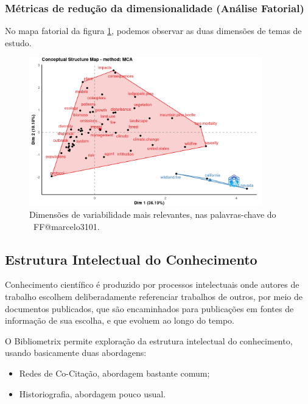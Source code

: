 \subsubsection{Métricas de redução da dimensionalidade (Análise Fatorial)}

No mapa fatorial da figura \ref{fig:FF@marcelo3101:FactorialAnalysis-MCA-FactorialMap}, podemos observar as duas dimensões de temas de estudo.

\begin{figure}
    \centering
    \includegraphics[width=0.9\textwidth]{exploratory-data-analysis/marcelo3101/PesqBibliogr/ForestFire/WoS-20221204/assets/FactorialAnalysis.png}
    \caption{Dimensões de variabilidade mais relevantes, nas palavras-chave do  \dataset\ FF@marcelo3101.}
    \label{fig:FF@marcelo3101:FactorialAnalysis-MCA-FactorialMap}
\end{figure}

\subsection{Estrutura Intelectual do Conhecimento}

Conhecimento científico é produzido por processos intelectuais onde autores de trabalho escolhem deliberadamente referenciar trabalhos de outros, por meio de documentos publicados, que são encaminhados para publicações em fontes de informação de sua escolha, e que evoluem ao longo do tempo.

O Bibliometrix permite exploração da estrutura intelectual do conhecimento, usando basicamente duas abordagens:
\begin{itemize}
    \item Redes de Co-Citação, abordagem bastante comum;
    \item Historiografia, abordagem pouco usual.
\end{itemize}

